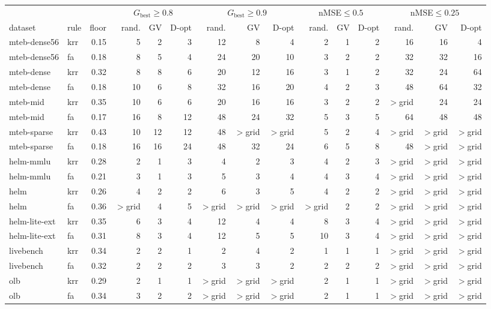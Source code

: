 \begin{tabular}{llrrrrrrrrrrrrr}
\toprule
 & & & \multicolumn{3}{c}{$G_\mathrm{best}\geq0.8$} & \multicolumn{3}{c}{$G_\mathrm{best}\geq0.9$} & \multicolumn{3}{c}{nMSE$\leq0.5$} & \multicolumn{3}{c}{nMSE$\leq0.25$} \\
\cmidrule(lr){4-6}\cmidrule(lr){7-9}\cmidrule(lr){10-12}\cmidrule(lr){13-15}
dataset & rule & floor & rand. & GV & D-opt & rand. & GV & D-opt & rand. & GV & D-opt & rand. & GV & D-opt \\
\midrule
mteb-dense56 & krr & 0.15 & 5 & 2 & 3 & 12 & 8 & 4 & 2 & 1 & 2 & 16 & 16 & 4 \\
mteb-dense56 & fa & 0.18 & 8 & 5 & 4 & 24 & 20 & 10 & 3 & 2 & 2 & 32 & 32 & 16 \\
mteb-dense & krr & 0.32 & 8 & 8 & 6 & 20 & 12 & 16 & 3 & 1 & 2 & 32 & 24 & 64 \\
mteb-dense & fa & 0.18 & 10 & 6 & 8 & 32 & 16 & 20 & 4 & 2 & 3 & 48 & 64 & 32 \\
mteb-mid & krr & 0.35 & 10 & 6 & 6 & 20 & 16 & 16 & 3 & 2 & 2 & $>$grid & 24 & 24 \\
mteb-mid & fa & 0.17 & 16 & 8 & 12 & 48 & 24 & 32 & 5 & 3 & 5 & 64 & 48 & 48 \\
mteb-sparse & krr & 0.43 & 10 & 12 & 12 & 48 & $>$grid & $>$grid & 5 & 2 & 4 & $>$grid & $>$grid & $>$grid \\
mteb-sparse & fa & 0.18 & 16 & 16 & 24 & 48 & 32 & 24 & 6 & 5 & 8 & 48 & $>$grid & $>$grid \\
helm-mmlu & krr & 0.28 & 2 & 1 & 3 & 4 & 2 & 3 & 4 & 2 & 3 & $>$grid & $>$grid & $>$grid \\
helm-mmlu & fa & 0.21 & 3 & 1 & 3 & 5 & 3 & 4 & 4 & 3 & 4 & $>$grid & $>$grid & $>$grid \\
helm & krr & 0.26 & 4 & 2 & 2 & 6 & 3 & 5 & 4 & 2 & 2 & $>$grid & $>$grid & $>$grid \\
helm & fa & 0.36 & $>$grid & 4 & 5 & $>$grid & $>$grid & $>$grid & $>$grid & 2 & 2 & $>$grid & $>$grid & $>$grid \\
helm-lite-ext & krr & 0.35 & 6 & 3 & 4 & 12 & 4 & 4 & 8 & 3 & 4 & $>$grid & $>$grid & $>$grid \\
helm-lite-ext & fa & 0.31 & 8 & 3 & 4 & 12 & 5 & 5 & 10 & 3 & 4 & $>$grid & $>$grid & $>$grid \\
livebench & krr & 0.34 & 2 & 2 & 1 & 2 & 4 & 2 & 1 & 1 & 1 & $>$grid & $>$grid & $>$grid \\
livebench & fa & 0.32 & 2 & 2 & 2 & 3 & 3 & 2 & 2 & 2 & 2 & $>$grid & $>$grid & $>$grid \\
olb & krr & 0.29 & 2 & 1 & 1 & $>$grid & $>$grid & $>$grid & 2 & 1 & 1 & $>$grid & $>$grid & $>$grid \\
olb & fa & 0.34 & 3 & 2 & 2 & $>$grid & $>$grid & $>$grid & 2 & 1 & 1 & $>$grid & $>$grid & $>$grid \\
\bottomrule
\end{tabular}
